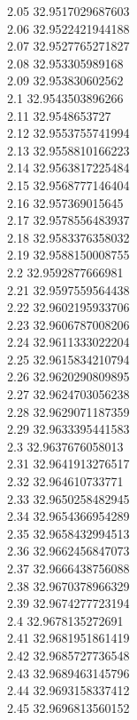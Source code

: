 {2.05	32.9517029687603\\
2.06	32.9522421944188\\
2.07	32.9527765271827\\
2.08	32.953305989168\\
2.09	32.953830602562\\
2.1	32.9543503896266\\
2.11	32.9548653727\\
2.12	32.9553755741994\\
2.13	32.9558810166223\\
2.14	32.9563817225484\\
2.15	32.9568777146404\\
2.16	32.957369015645\\
2.17	32.9578556483937\\
2.18	32.9583376358032\\
2.19	32.9588150008755\\
2.2	32.9592877666981\\
2.21	32.9597559564438\\
2.22	32.9602195933706\\
2.23	32.9606787008206\\
2.24	32.9611333022204\\
2.25	32.9615834210794\\
2.26	32.9620290809895\\
2.27	32.9624703056238\\
2.28	32.9629071187359\\
2.29	32.9633395441583\\
2.3	32.9637676058013\\
2.31	32.9641913276517\\
2.32	32.964610733771\\
2.33	32.9650258482945\\
2.34	32.9654366954289\\
2.35	32.9658432994513\\
2.36	32.9662456847073\\
2.37	32.9666438756088\\
2.38	32.9670378966329\\
2.39	32.9674277723194\\
2.4	32.9678135272691\\
2.41	32.9681951861419\\
2.42	32.9685727736548\\
2.43	32.9689463145796\\
2.44	32.9693158337412\\
2.45	32.9696813560152\\
}
